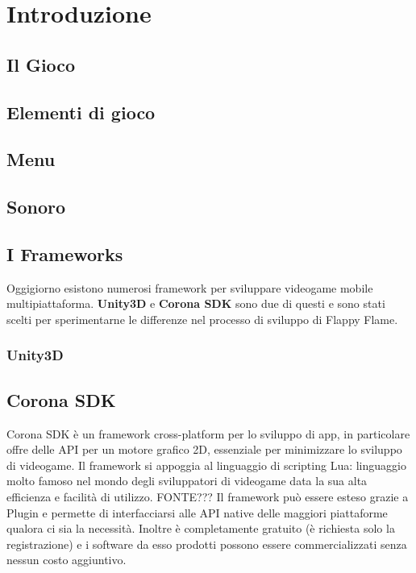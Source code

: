 \section{Introduzione}

	\subsection{Il Gioco}
			
			
		\subsection{Elementi di gioco}
		
		\subsection{Menu}
		
		\subsection{Sonoro}
	
	
	
\newpage
	
	\subsection{I Frameworks}
		Oggigiorno esistono numerosi framework per sviluppare videogame mobile multipiattaforma. \textbf{Unity3D} e \textbf{Corona SDK} sono due di questi e sono stati scelti per sperimentarne le differenze nel processo di sviluppo di Flappy Flame.
		
		\subsubsection{Unity3D}
		
		\subsection{Corona SDK}
			Corona SDK è un framework cross-platform per lo sviluppo di app, in particolare offre delle API per un motore grafico 2D, essenziale per minimizzare lo sviluppo di videogame. Il framework si appoggia al linguaggio di scripting Lua: linguaggio molto famoso nel mondo degli sviluppatori di videogame data la sua alta efficienza e facilità di utilizzo. FONTE??? Il framework può essere esteso grazie a Plugin e permette di interfacciarsi alle API native delle maggiori piattaforme qualora ci sia la necessità. Inoltre è completamente gratuito (è richiesta solo la registrazione) e i software da esso prodotti possono essere commercializzati senza nessun costo aggiuntivo.
		
